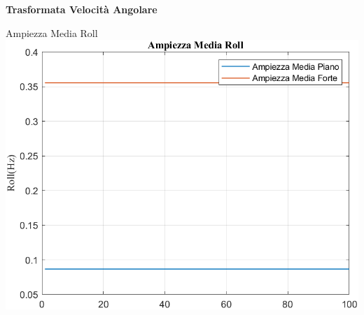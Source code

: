 \documentclass[beamer]{standalone}
\begin{document}
	\begin{frame}
		\color{blue}\centering\huge{\textbf{Trasformata Velocità Angolare}}
	\end{frame}
	
%	
%	
%	
%	
	
	\begin{frame}{{Ampiezza Media Roll}}
		\centering\includegraphics[height=.8\textheight]{figure/VAng/Trasformata/Ampiezza MediaRoll}
	\end{frame}
	
\end{document}
